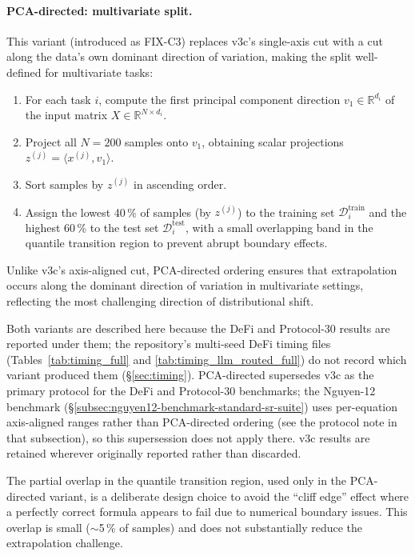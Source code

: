 \documentclass[twoside,11pt]{article}
\begin{document}
\paragraph{PCA-directed: multivariate split.}
This variant (introduced as FIX-C3) replaces v3c's single-axis cut with a
cut along the data's own dominant direction of variation, making the split
well-defined for multivariate tasks:
\begin{enumerate}[leftmargin=2em,label=\arabic*.]
  \item For each task $i$, compute the first principal component direction
    $v_1 \in \mathbb{R}^{d_i}$ of the input matrix $X \in \mathbb{R}^{N \times d_i}$.
  \item Project all $N=200$ samples onto $v_1$, obtaining scalar projections
    $z^{(j)} = \langle x^{(j)}, v_1 \rangle$.
  \item Sort samples by $z^{(j)}$ in ascending order.
  \item Assign the lowest 40\,\% of samples (by $z^{(j)}$) to the training set
    $\mathcal{D}^{\mathrm{train}}_i$ and the highest 60\,\% to the test set
    $\mathcal{D}^{\mathrm{test}}_i$, with a small overlapping band in the
    quantile transition region to prevent abrupt boundary effects.
\end{enumerate}
Unlike v3c's axis-aligned cut, PCA-directed ordering ensures that
extrapolation occurs along the dominant direction of variation in
multivariate settings, reflecting the most challenging direction of
distributional shift.

Both variants are described here because the DeFi and Protocol-30 results are
reported under them; the repository's multi-seed DeFi timing files
(Tables~\ref{tab:timing_full} and \ref{tab:timing_llm_routed_full}) do not
record which variant produced them (\S\ref{sec:timing}). PCA-directed supersedes v3c as the primary protocol for the
DeFi and Protocol-30 benchmarks; the Nguyen-12 benchmark
(\S\ref{subsec:nguyen12-benchmark-standard-sr-suite}) uses per-equation
axis-aligned ranges rather than PCA-directed ordering (see the protocol
note in that subsection), so this supersession does not apply there.
v3c results are retained wherever originally reported rather than discarded.

\begin{remark}
The partial overlap in the quantile transition region, used only in the
PCA-directed variant, is a deliberate design choice to avoid the ``cliff
edge'' effect where a perfectly correct formula appears to fail due to
numerical boundary issues. This overlap is small ($\sim$5\,\% of samples)
and does not substantially reduce the extrapolation challenge.
\end{remark}
\end{document}
